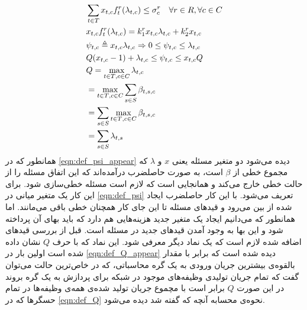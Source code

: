 	\begin{subequations}\label{eqn:constraint_load_managing}
		\begin{align}
		&\sum_{t \in T}x_{t,c}f_t^r(\lambda_{t,c}) \le \sigma_c^r \quad \forall{r \in R}, \forall{c \in C} \\
		&x_{t,c}f_t^r(\lambda_{t,c}) = k_1^rx_{t,c}\lambda_{t,c} + k_2^rx_{t,c} \label{eqn:def_psi_appear} \\
		&\psi_{t,c} \triangleq x_{t,c}\lambda_{t,c} \Rightarrow 0 \leq \psi_{t,c} \leq \lambda_{t,c} \label{eqn:def_psi} \\
		&Q(x_{t,c}-1)+\lambda_{t,c} \leq \psi_{t,c} \leq x_{t,c}Q \label{eqn:def_Q_appear}\\
		&\notag Q = \max_{{t \in T},{c \in C}} \lambda_{t,c} \\
		&\notag =\max_{{t \in T},{c \in C}} \sum_{s \in S}\beta_{t,s,c} \\
		&\notag =\sum_{s\in S} \max_{{t \in T},{c \in C}} \beta_{t,s,c} \\
		&=\sum_{s \in S}\lambda_{t,s} \label{eqn:def_Q}
		\end{align}
	\end{subequations}
	همانطور که در \cref{eqn:def_psi_appear} دیده می‌شود دو متغیر مسئله یعنی $x$ و $\lambda$ که مجموع خطی از $\beta$ است، به صورت حاصلضرب درآمده‌اند که این اتفاق مسئله را از حالت خطی خارج می‌کند و همانجایی است که لازم است مسئله خطی‌سازی شود. برای این کار یک متغیر میانی در \cref{eqn:def_psi} تعریف می‌شود. با این کار حاصلضرب ایجاد شده از بین می‌رود و قیدهای مسئله تا این جای کار همچنان خطی باقی می‌مانند. اما همانطور که می‌دانیم ایجاد یک متغیر جدید هزینه‌هایی هم دارد که باید بهای آن پرداخته شود و این بها به وجود آمدن قیدهای جدید در مسئله است. 
	قبل از بررسی قیدهای اضافه شده لازم است که یک نماد دیگر معرفی شود. این نماد که با حرف $Q$ نشان داده شده است اولین بار در \cref{eqn:def_Q_appear} دیده شده است که برابر با مقدار بالقوه‌ی بیشترین جریان ورودی به یک گره محاسباتی، که در خاص‌ترین حالت می‌توان گفت که تمام جریان تولیدی وظیفه‌های موجود در شبکه برای پردازش به یک گره بروند در این صورت $Q$ برابر است با مچموع جریان تولید شده‌ی همه‌ی وظیفه‌ها در تمام حسگرها که در \cref{eqn:def_Q} نحوه‌ی محسابه آنچه که گفته شد دیده می‌شود. 
	
